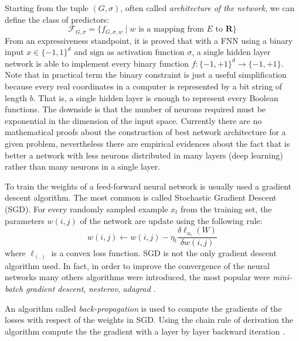 Starting from the tuple $(G, \sigma)$, often called \emph{architecture of the network}, we can define the class of predictors: 
\[ \mathcal{F}_{G, \sigma} = \{ f_{G, \sigma, w} \mid w \textrm{ is a mapping from } E \textrm{ to } \mathbf R \} \]
From an expressiveness standpoint, it is proved that with a FNN using a binary input $x \in \{-1, 1\}^d$ and $\mathrm{sign}$ as activation
function $\sigma$, a single hidden layer network is able to
implement every binary function $f: \{-1, +1\}^d \to \{-1, +1\}$. Note that in
practical term the binary constraint is just a useful simplification because every real coordinates in a computer is represented
by a bit string of length $b$. That is, a single hidden layer is
enough to represent every Boolean functions. The downside is that
the number of neurons required must be exponential in the dimension
of the input space. Currently there are no mathematical proofs about the construction of
best network architecture for a given problem, nevertheless there are empirical evidences
about the fact that is better a network with less neurons distributed in many layers (deep
learning) rather than many neurons in a single layer. %

To train the weights of a feed-forward neural network is usually
used a gradient descent algorithm. The most common is called
Stochastic Gradient Descent (SGD). For every randomly sampled
example $x_t$ from the training set, the parameters $w(i, j)$ of the
network are update using the following rule:
\begin{equation} \label{eq:sgd} 
w(i, j) \leftarrow w(i, j) -  \eta_t \frac{\delta\ell_{x_t}(W)}{\delta w(i, j )}
\end{equation}
where $\ell_(.)$ is a convex loss function. SGD is not the only
gradient descent algorithm used. In fact, in order to
improve the convergence of the neural networks many others algorithms were introduced,
the most popular were \emph{mini-batch gradient descent}, \emph{nesterov}, \emph{adagrad}
\cite{RuderGDOpt}. 

An algorithm called \emph{back-propagation} is used to compute the
gradients of the losses with respect of the weights in SGD. Using the chain rule of derivation the algorithm compute the the gradient with a layer by layer backward iteration
\cite{HintonBackProp}.
 

